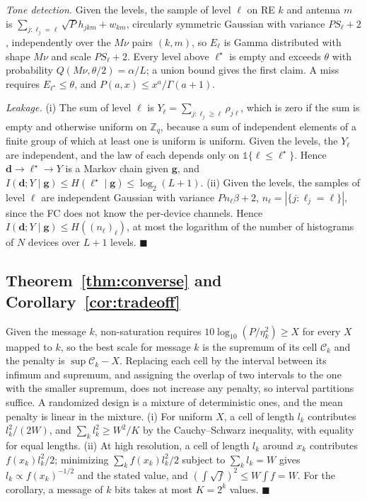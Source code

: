 \emph{Tone detection.} Given the levels, the sample of level $\ell$ on RE $k$ and antenna $m$ is $\sum_{j:\ell_j=\ell}\sqrt{P}h_{jkm}+w_{km}$, circularly symmetric Gaussian with variance $PS_\ell+2$, independently over the $M\nu$ pairs $(k,m)$, so $E_\ell$ is Gamma distributed with shape $M\nu$ and scale $PS_\ell+2$. Every level above $\ell^\star$ is empty and exceeds $\theta$ with probability $Q(M\nu,\theta/2)=\alpha/L$; a union bound gives the first claim. A miss requires $E_{\ell^\star}\le\theta$, and $P(a,x)\le x^a/\Gamma(a+1)$.

\emph{Leakage.} (i) The sum of level $\ell$ is $Y_\ell=\sum_{j:\ell_j\ge\ell}\rho_{j\ell}$, which is zero if the sum is empty and otherwise uniform on $\mathbb{Z}_q$, because a sum of independent elements of a finite group of which at least one is uniform is uniform. Given the levels, the $Y_\ell$ are independent, and the law of each depends only on $\mathbb{1}\{\ell\le\ell^\star\}$. Hence $\mathbf{d}\to\ell^\star\to Y$ is a Markov chain given $\mathbf{g}$, and $I(\mathbf{d};Y\mid\mathbf{g})\le H(\ell^\star\mid\mathbf{g})\le\log_2(L+1)$. (ii) Given the levels, the samples of level $\ell$ are independent Gaussian with variance $Pn_\ell\beta+2$, $n_\ell=|\{j:\ell_j=\ell\}|$, since the FC does not know the per-device channels. Hence $I(\mathbf{d};Y\mid\mathbf{g})\le H((n_\ell)_\ell)$, at most the logarithm of the number of histograms of $N$ devices over $L+1$ levels. \hfill$\blacksquare$

\subsection{Theorem~\ref{thm:converse} and Corollary~\ref{cor:tradeoff}}
Given the message $k$, non-saturation requires $10\log_{10}(P/\eta_k^2)\ge X$ for every $X$ mapped to $k$, so the best scale for message $k$ is the supremum of its cell $\mathcal{C}_k$ and the penalty is $\sup\mathcal{C}_k-X$. Replacing each cell by the interval between its infimum and supremum, and assigning the overlap of two intervals to the one with the smaller supremum, does not increase any penalty, so interval partitions suffice. A randomized design is a mixture of deterministic ones, and the mean penalty is linear in the mixture. (i) For uniform $X$, a cell of length $l_k$ contributes $l_k^2/(2W)$, and $\sum_kl_k^2\ge W^2/K$ by the Cauchy--Schwarz inequality, with equality for equal lengths. (ii) At high resolution, a cell of length $l_k$ around $x_k$ contributes $f(x_k)l_k^2/2$; minimizing $\sum_kf(x_k)l_k^2/2$ subject to $\sum_kl_k=W$ gives $l_k\propto f(x_k)^{-1/2}$ and the stated value, and $(\int\sqrt f)^2\le W\int f=W$. For the corollary, a message of $k$ bits takes at most $K=2^k$ values. \hfill$\blacksquare$


